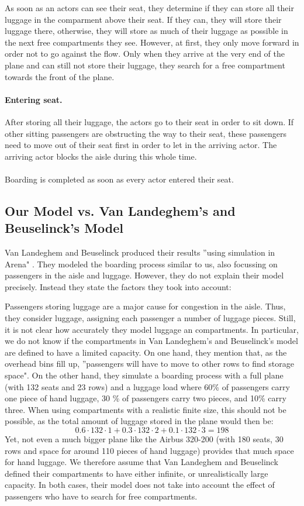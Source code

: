 \documentclass[11pt]{article}
\begin{document}
	As soon as an actors can see their seat, they determine if they can store all their luggage in the comparment above their seat. If they can, they will store their luggage there, otherwise, they will store as much of their luggage as possible in the next free compartments they see. However, at first, they only move forward in order not to go against the flow. Only when they arrive at the very end of the plane and can still not store their luggage, they search for a free compartment towards the front of the plane.


\paragraph{Entering seat.}
After storing all their luggage, the actors go to their seat in order to sit down. If other sitting passengers are obstructing the way to their seat, these passengers need to move out of their seat first in order to let in the arriving actor. The arriving actor blocks the aisle during this whole time.
\\\\
Boarding is completed as soon as every actor entered their seat.






\subsection{Our Model vs. Van Landeghem's and Beuselinck's Model} 

Van Landeghem and Beuselinck produced their results ''using simulation in Arena" \cite{beus}. They modeled the boarding process similar to us, also focussing on passengers in the aisle and luggage. However, they do not explain their model precisely. Instead they state the factors they took into account:


Passengers storing luggage are a major cause for congestion in the aisle. Thus, they consider luggage, assigning each passenger a number of luggage pieces. Still, it is not clear how accurately they model luggage an compartments. In particular, we do not know if the compartments in Van Landeghem's and Beuselinck's model are defined to have a limited capacity. On one hand, they mention that, as the overhead bins fill up, ''passengers will have to move to other rows to find storage space"\cite{beus}. On the other hand, they simulate a boarding process with a full plane (with 132 seats and 23 rows) and a luggage load where 60\% of passengers carry one piece of hand luggage, 30 \% of passengers carry two pieces, and 10\% carry three. When using compartments with a realistic finite size, this should not be possible, as the total amount of luggage stored in the plane would then be:
$$ 0.6 \cdot 132 \cdot 1+ 0.3 \cdot 132 \cdot 2 + 0.1 \cdot 132 \cdot 3 = 198$$
Yet, not even a much bigger plane like the Airbus 320-200 (with 180 seats, 30 rows and space for around 110 pieces of hand luggage) provides that much space for hand luggage. We therefore assume that Van Landeghem and Beuselinck defined their compartments to have either infinite, or unrealistically large capacity. In both cases, their model does not take into account the effect of passengers who have to search for free compartments.
\end{document}

